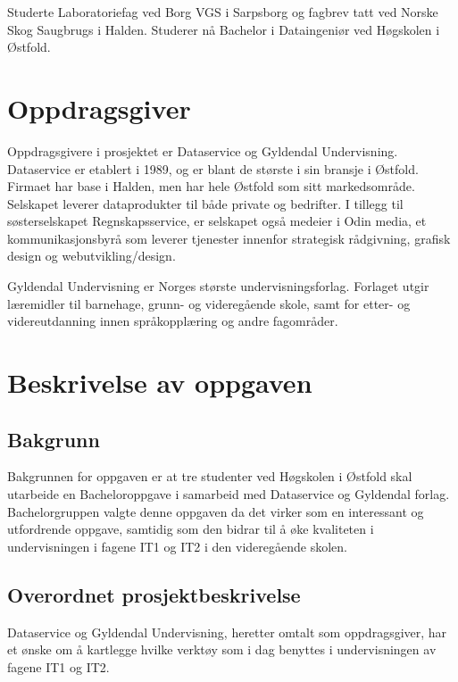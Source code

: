 \documentclass[norsk,a4paper,12pt]{article}
\begin{document}
Studerte Laboratoriefag ved Borg VGS i Sarpsborg og fagbrev tatt ved Norske Skog Saugbrugs i Halden. Studerer nå Bachelor i Dataingeniør ved Høgskolen i Østfold.


\section{Oppdragsgiver}

Oppdragsgivere i prosjektet er Dataservice og Gyldendal Undervisning. Dataservice er etablert i 1989, og er blant de største i sin bransje i Østfold. Firmaet har base i Halden, men har hele Østfold som sitt markedsområde. Selskapet leverer dataprodukter til både private og bedrifter. I tillegg til søsterselskapet Regnskapsservice, er selskapet også medeier i Odin media, et kommunikasjonsbyrå som leverer tjenester innenfor strategisk rådgivning, grafisk design og webutvikling/design.\newline

Gyldendal Undervisning er Norges største undervisningsforlag. Forlaget utgir læremidler til barnehage, grunn- og videregående skole, samt for etter- og videreutdanning innen språkopplæring og andre fagområder.

\newpage

\section{Beskrivelse av oppgaven}

\subsection{Bakgrunn}

Bakgrunnen for oppgaven er at tre studenter ved Høgskolen i Østfold skal utarbeide en Bacheloroppgave i samarbeid med Dataservice og Gyldendal forlag. 
Bachelorgruppen valgte denne oppgaven da det virker som en interessant og utfordrende oppgave, samtidig som den bidrar til å øke kvaliteten i undervisningen i fagene IT1 og IT2 i den videregående skolen. 

\subsection{Overordnet prosjektbeskrivelse}

Dataservice og Gyldendal Undervisning, heretter omtalt som oppdragsgiver,  har et ønske om å kartlegge hvilke verktøy som i dag benyttes i undervisningen av fagene IT1 og IT2. 
\end{document}
